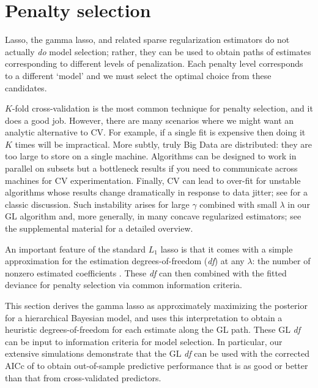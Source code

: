 \documentclass[12pt]{article}
\begin{document}
\section{Penalty selection}
\label{sec:select}

Lasso, the gamma lasso, and related 
sparse regularization estimators do not actually {\it do} model selection; rather, they
can be used to obtain paths of estimates corresponding to different levels of
penalization.  Each penalty level corresponds to a different `model'
and we must select the optimal choice from these candidates.

$K$-fold cross-validation \cite[CV; e.g.,][]{efron_estimation_2004} 
is the most common technique for penalty selection, and it does a good job.  However, there are many scenarios where
we might want an analytic alternative to CV.  For example, if a single fit is expensive then doing it $K$
times will be impractical.  More subtly, truly Big Data are distributed: they
are too large to store on a single machine. Algorithms can be designed to work
in parallel on subsets
\citep[e.g.,][]{taddy_distributed_2015} but a bottleneck
results if you need to communicate across machines for CV experimentation.
Finally, CV can lead to over-fit for unstable algorithms whose
results change dramatically in response to data jitter; see
\cite{breiman_heuristics_1996} for a classic discussion.  Such instability
arises for large $\gamma$ combined with small $\lambda$ in our GL algorithm
and, more generally, in many concave regularized estimators; see the
supplemental material for a detailed overview.

An important feature of the standard $L_1$ lasso is that it comes with a
simple approximation for the estimation degrees-of-freedom (\textit{df}) at
any $\lambda$: the number of nonzero estimated coefficients
\citep[see][]{zou_degrees_2007}.  These \textit{df} can then combined with the fitted
deviance for penalty selection via common information criteria.

This section derives the gamma lasso as approximately maximizing the posterior
for a hierarchical Bayesian model, and uses this
interpretation to obtain a heuristic degrees-of-freedom for each estimate
along the GL path.  These GL \textit{df} can  be input to information criteria
for model selection. In particular, our extensive simulations demonstrate that the GL
\textit{df} can be used with  the corrected AICc of
\citet{hurvich_regression_1989}  to obtain out-of-sample predictive
performance that is as good or better than that from cross-validated
predictors.
\end{document}
